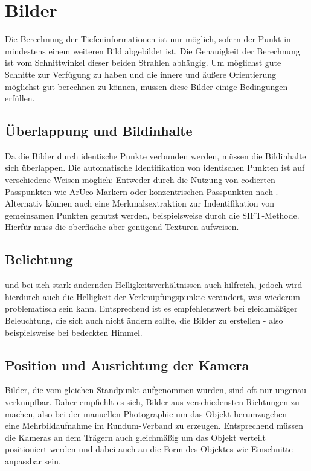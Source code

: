\documentclass[./00PhotoBox.tex]{subfiles}
\begin{document}
\section{Bilder}
\label{s:bilder}

Die Berechnung der Tiefeninformationen ist nur möglich, sofern der Punkt in mindestens einem weiteren Bild abgebildet ist. Die Genauigkeit der Berechnung ist vom Schnittwinkel dieser beiden Strahlen abhängig. Um möglichst gute Schnitte zur Ver\-fügung zu haben und die innere und äußere Orientierung möglichst gut berechnen zu können, müssen diese Bilder einige Bedingungen erfüllen.

\subsection{Überlappung und Bildinhalte}
Da die Bilder durch identische Punkte verbunden werden, müssen die Bildinhalte sich überlappen. Die automatische Identifikation von identischen Punkten ist auf verschiedene Weisen möglich: Entweder durch die Nutzung von codierten Passpunkten wie ArUco-Markern oder konzentrischen Passpunkten nach \cite{schneider}. Alternativ können auch eine Merkmalsextraktion zur Indentifikation von gemeinsamen Punkten genutzt werden, beispielsweise durch die SIFT-Methode. Hierfür muss die oberfläche aber genügend Texturen aufweisen. \citep[S. 478]{luhmann}

\subsection{Belichtung}
und bei sich stark ändernden Helligkeitsverhältnissen auch hilfreich, jedoch wird hierdurch auch die Helligkeit der Verknüpfungspunkte verändert, was wiederum problematisch sein kann. Entsprechend ist es empfehlenswert bei gleichmäßiger Beleuchtung, die sich auch nicht ändern sollte, die Bilder zu erstellen - also beispielsweise bei bedeckten Himmel.

\subsection{Position und Ausrichtung der Kamera}
Bilder, die vom gleichen Standpunkt aufgenommen wurden, sind oft nur ungenau verknüpfbar. Daher empfiehlt es sich, Bilder aus verschiedensten Richtungen zu machen, also bei der manuellen Photographie um das Objekt herumzugehen - eine Mehrbildaufnahme im Rundum-Verband zu erzeugen. \citep[S. 170]{luhmann}
Entsprechend müssen die Kameras an dem Trägern auch gleichmäßig um das Objekt verteilt positioniert werden und dabei auch an die Form des Objektes wie Einschnitte anpassbar sein.
\end{document}
